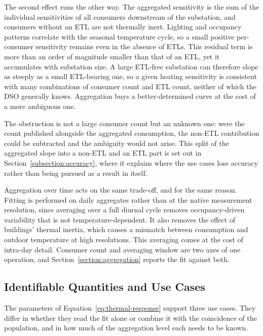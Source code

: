 \documentclass[9pt,journal,a4]{IEEEtran}
\begin{document}
The second effect runs the other way. The aggregated sensitivity is the sum of the individual sensitivities of all consumers downstream of the substation, and consumers without an ETL are not thermally inert. Lighting and occupancy patterns correlate with the seasonal temperature cycle, so a small positive per-consumer sensitivity remains even in the absence of ETLs. This residual term is more than an order of magnitude smaller than that of an ETL, yet it accumulates with substation size. A large ETL-free substation can therefore slope as steeply as a small ETL-bearing one, so a given heating sensitivity is consistent with many combinations of consumer count and ETL count, neither of which the DSO generally knows. Aggregation buys a better-determined curve at the cost of a more ambiguous one.

The obstruction is not a large consumer count but an unknown one: were the count published alongside the aggregated consumption, the non-ETL contribution could be subtracted and the ambiguity would not arise. This split of the aggregated slope into a non-ETL and an ETL part is set out in Section~\ref{subsection:accuracy}, where it explains where the use cases lose accuracy rather than being pursued as a result in itself.

Aggregation over time acts on the same trade-off, and for the same reason. Fitting is performed on daily aggregates rather than at the native measurement resolution, since averaging over a full diurnal cycle removes occupancy-driven variability that is not temperature-dependent. It also removes the effect of buildings' thermal inertia, which causes a mismatch between consumption and outdoor temperature at high resolutions. This averaging comes at the cost of intra-day detail. Consumer count and averaging window are two axes of one operation, and Section~\ref{section:aggregation} reports the fit against both.


\subsection{Identifiable Quantities and Use Cases}

The parameters of Equation~\eqref{eq:thermal-response} support three use cases. They differ in whether they read the fit alone or combine it with the coincidence of the population, and in how much of the aggregation level each needs to be known.
\end{document}
